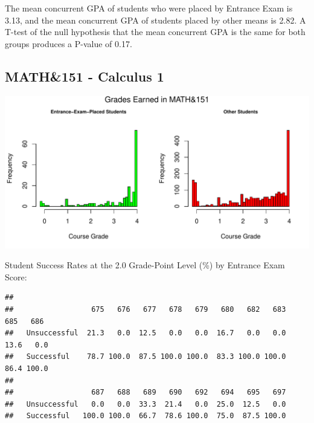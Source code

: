 \documentclass[twoside]{article}\usepackage[]{graphicx}\usepackage[]{color}
\makeatletter
\def\maxwidth{ %
  \ifdim\Gin@nat@width>\linewidth
    \linewidth
  \else
    \Gin@nat@width
  \fi
}
\newenvironment{kframe}{%
 \def\at@end@of@kframe{}%
 \ifinner\ifhmode%
  \def\at@end@of@kframe{\end{minipage}}%
  \begin{minipage}{\columnwidth}%
 \fi\fi%
 \def\FrameCommand##1{\hskip\@totalleftmargin \hskip-\fboxsep
 \colorbox{shadecolor}{##1}\hskip-\fboxsep
     \hskip-\linewidth \hskip-\@totalleftmargin \hskip\columnwidth}%
 \MakeFramed {\advance\hsize-\width
   \@totalleftmargin\z@ \linewidth\hsize
   \@setminipage}}%
 {\par\unskip\endMakeFramed%
 \at@end@of@kframe}
\newenvironment{knitrout}{}{} %
\makeatother
\begin{document}
The mean concurrent GPA of students who were placed by Entrance Exam is 3.13, and the mean concurrent GPA of students placed by other means is 2.82.  A T-test of the null hypothesis that the mean concurrent GPA is the same for both groups produces a P-value of 0.17.





\newpage
\subsection{MATH\&151 - Calculus 1}


\begin{knitrout}
\color{fgcolor}
\includegraphics[width=\maxwidth]{figure/graphs151-1} 

\end{knitrout}


Student Success Rates  at the 2.0 Grade-Point Level (\%) by Entrance Exam Score:

\begin{knitrout}
\color{fgcolor}\begin{kframe}
\begin{verbatim}
##               
##                  675   676   677   678   679   680   682   683   685   686
##   Unsuccessful  21.3   0.0  12.5   0.0   0.0  16.7   0.0   0.0  13.6   0.0
##   Successful    78.7 100.0  87.5 100.0 100.0  83.3 100.0 100.0  86.4 100.0
##               
##                  687   688   689   690   692   694   695   697
##   Unsuccessful   0.0   0.0  33.3  21.4   0.0  25.0  12.5   0.0
##   Successful   100.0 100.0  66.7  78.6 100.0  75.0  87.5 100.0
\end{verbatim}
\end{kframe}
\end{knitrout}
\end{document}
